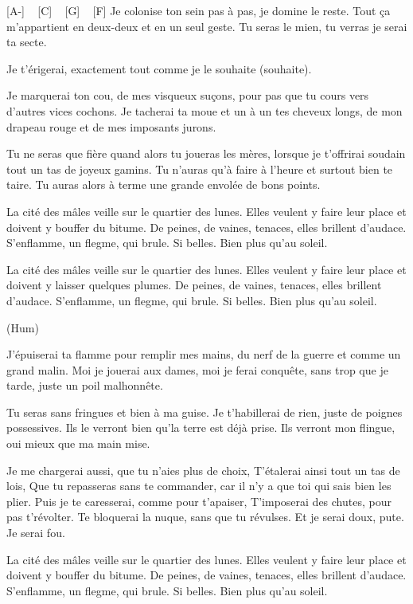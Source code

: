 [A-] ~ [C] ~ [G] ~ [F]
Je colonise ton sein pas à pas, je domine le reste.
Tout ça m'appartient en deux-deux et en un seul geste.
Tu seras le mien, tu verras je serai ta secte.

Je t'érigerai, exactement tout comme je le souhaite (souhaite).

Je marquerai ton cou, de mes visqueux suçons,
pour pas que tu cours vers d'autres vices cochons.
Je tacherai ta moue et un à un tes cheveux longs,
de mon drapeau rouge et de mes imposants jurons.

Tu ne seras que fière quand alors tu joueras les mères,
lorsque je t'offrirai soudain tout un tas de joyeux gamins.
Tu n'auras qu'à faire à l'heure et surtout bien te taire.
Tu auras alors à terme une grande envolée de bons points.


La cité des mâles veille sur le quartier des lunes.
Elles veulent y faire leur place et doivent y bouffer du bitume.
De peines, de vaines, tenaces, elles brillent d'audace.
S'enflamme, un flegme, qui brule. Si belles.
Bien plus qu'au soleil.

La cité des mâles veille sur le quartier des lunes.
Elles veulent y faire leur place et doivent y laisser quelques plumes.
De peines, de vaines, tenaces, elles brillent d'audace.
S'enflamme, un flegme, qui brule. Si belles.
Bien plus qu'au soleil.


(Hum)

J'épuiserai ta flamme pour remplir mes mains,
du nerf de la guerre et comme un grand malin.
Moi je jouerai aux dames, moi je ferai conquête,
sans trop que je tarde, juste un poil malhonnête.

Tu seras sans fringues et bien à ma guise.
Je t'habillerai de rien, juste de poignes possessives.
Ils le verront bien qu’la terre est déjà prise.
Ils verront mon flingue, oui mieux que ma main mise.


Je me chargerai aussi, que tu n'aies plus de choix,
T'étalerai ainsi tout un tas de lois,
Que tu repasseras sans te commander,
car il n'y a que toi qui sais bien les plier.
Puis je te caresserai, comme pour t'apaiser,
T'imposerai des chutes, pour pas t’révolter.
Te bloquerai la nuque, sans que tu révulses.
Et je serai doux, pute. Je serai fou.

La cité des mâles veille sur le quartier des lunes.
Elles veulent y faire leur place et doivent y bouffer du bitume.
De peines, de vaines, tenaces, elles brillent d'audace.
S'enflamme, un flegme, qui brule. Si belles.
Bien plus qu'au soleil.


